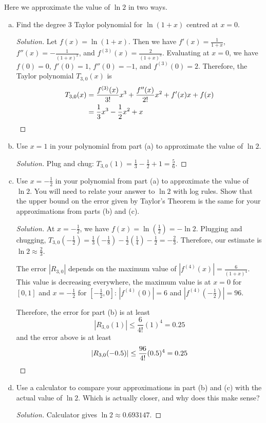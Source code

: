 \documentclass{agony}
\begin{document}
\question Here we approximate the value of $\ln 2$ in two ways.
\begin{enumerate}[(a)]
  \item Find the degree 3 Taylor polynomial for $\ln(1+x)$ centred at $x = 0$.
        \begin{proof}[Solution]
          Let $f(x) = \ln(1+x)$.
          Then we have $f'(x) = \frac{1}{1+x}$, $f''(x) = -\frac{1}{(1+x)^2}$,
          and $f^{(3)}(x) = \frac{2}{(1+x)^3}$.
          Evaluating at $x=0$, we have $f(0) = 0$, $f'(0) = 1$, $f''(0) = -1$, and $f^{(3)}(0)=2$.
          Therefore, the Taylor polynomial $T_{3,0}(x)$ is
          \begin{align*}
            T_{3,0}(x) & = \frac{f^{(3)}(x)}{3!}x^3 + \frac{f''(x)}{2!}x^2 + f'(x) x + f(x) \\
                       & = \frac{1}{3}x^3 - \frac{1}{2}x^2 + x \qedhere
          \end{align*}
        \end{proof}
  \item Use $x=1$ in your polynomial from part (a) to approximate the value of $\ln 2$.
        \begin{proof}[Solution]
          Plug and chug: $T_{3,0}(1) = \frac{1}{3} - \frac{1}{2} + 1 = \frac{5}{6}$.
        \end{proof}
  \item Use $x=-\frac12$ in your polynomial from part (a) to approximate the value of $\ln 2$.
        You will need to relate your answer to $\ln 2$ with log rules.
        Show that the upper bound on the error given by Taylor's Theorem is the same
        for your approximations from parts (b) and (c).
        \begin{proof}[Solution]
          At $x=-\frac12$, we have $f(x) = \ln(\frac12) = -\ln 2$. Plugging and chugging,
          $T_{3,0}(-\frac12) = \frac13(-\frac18) - \frac12(\frac14) - \frac12 = -\frac23$.
          Therefore, our estimate is $\ln 2 \approx \frac23$.

          The error $|R_{3,0}|$ depends on the maximum value of $|f^{(4)}(x)| = \frac{6}{(1+x)^4}$.
          This value is decreasing everywhere, the maximum value is at $x=0$ for $[0,1]$
          and $x=-\frac12$ for $[-\frac12,0]$: $|f^{(4)}(0)| = 6$ and $|f^{(4)}(-\frac12)| = 96$.

          Therefore, the error for part (b) is at least
          \[ |R_{3,0}(1)| \leq \frac{6}{4!}(1)^4 = 0.25 \]
          and the error above is at least
          \[ |R_{3,0}(-0.5)| \leq \frac{96}{4!}(0.5)^4 = 0.25 \qedhere \]
        \end{proof}
  \item Use a calculator to compare your approximations in part (b) and (c)
        with the actual value of $\ln 2$. Which is actually closer, and why does this make sense?
        \begin{proof}[Solution]
          Calculator gives $\ln 2 \approx 0.693147$.


\end{proof}
\end{enumerate}
\end{document}
